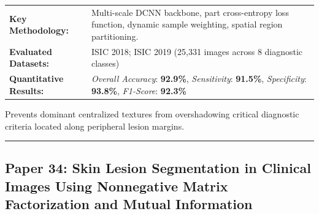\documentclass[10pt,a4paper]{article}
\begin{document}
\vspace{4pt}
\begin{tabularx}{\linewidth}{p{3.2cm}X}
\toprule
\textbf{Key Methodology:} & Multi-scale DCNN backbone, part cross-entropy loss function, dynamic sample weighting, spatial region partitioning. \\
\textbf{Evaluated Datasets:} & ISIC 2018; ISIC 2019 (25,331 images across 8 diagnostic classes) \\
\textbf{Quantitative Results:} & \textit{Overall Accuracy}: \textbf{92.9\%}, \textit{Sensitivity}: \textbf{91.5\%}, \textit{Specificity}: \textbf{93.8\%}, \textit{F1-Score}: \textbf{92.3\%} \\
\bottomrule
\end{tabularx}
\vspace{4pt}
\begin{tcolorbox}[utilitybox,title=Clinical Utility and Real-World Impact]
Prevents dominant centralized textures from overshadowing critical diagnostic criteria located along peripheral lesion margins.
\end{tcolorbox}
\vspace{12pt}
\hrule
\vspace{12pt}
\subsection*{Paper 34: Skin Lesion Segmentation in Clinical Images Using Nonnegative Matrix Factorization and Mutual Information}
\end{document}
